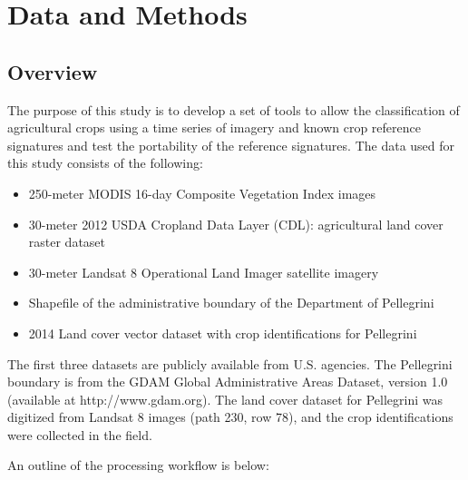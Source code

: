 \chapter{Data and Methods}
\label{chapter:methods}

\section{Overview}

The purpose of this study is to develop a set of tools to allow the classification of agricultural crops using a time series of imagery and known crop reference signatures and test the portability of the reference signatures. The data used for this study consists of the following:

\begin{Spacing}{1.2}
\begin{itemize}
  \item 250-meter MODIS 16-day Composite Vegetation Index images
  \item 30-meter 2012 USDA Cropland Data Layer (CDL): agricultural land cover raster dataset
  \item 30-meter Landsat 8 Operational Land Imager satellite imagery
  \item Shapefile of the administrative boundary of the Department of Pellegrini
  \item 2014 Land cover vector dataset with crop identifications for Pellegrini
\end{itemize}
\end{Spacing}

The first three datasets are publicly available from U.S. agencies. The Pellegrini boundary is from the GDAM Global Administrative Areas Dataset, version 1.0 (available at http://www.gdam.org). The land cover dataset for Pellegrini was digitized from Landsat 8 images (path 230, row 78), and the crop identifications were collected in the field.

An outline of the processing workflow is below:

